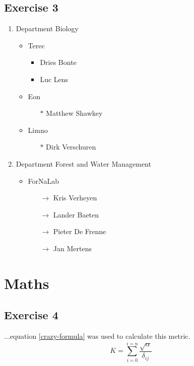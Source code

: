\documentclass[a4paper,12pt]{article}
\begin{document}
\subsection{Exercise 3}
\begin{enumerate}
	\item Department Biology
	\begin{itemize}
		\item Terec
		\begin{itemize}
			\item Dries Bonte
			\item Luc Lens
		\end{itemize}
		\item Eon
		\begin{itemize}
			\item[$\ast$] Matthew Shawkey
		\end{itemize}
		\item Limno
		\begin{itemize}
			\item[$\ast$] Dirk Verschuren
		\end{itemize}
	\end{itemize}
	\item Department Forest and Water Management
	\begin{itemize}
		\item ForNaLab
		\begin{itemize}
			\item[$\rightarrow$] Kris Verheyen
			\item[$\rightarrow$] Lander Baeten
			\item[$\rightarrow$] Pieter De Frenne
			\item[$\rightarrow$] Jan Mertens
		\end{itemize}
	\end{itemize}
\end{enumerate}

\section{Maths}
\subsection{Exercise 4}
...equation \ref{crazy-formula} was used to calculate this metric.
\begin{equation}\label{crazy-formula}
K = \sum_{i=0}^{i=n}\frac{\sqrt{\alpha}}{\delta_{ij}}
\end{equation}
\end{document}
